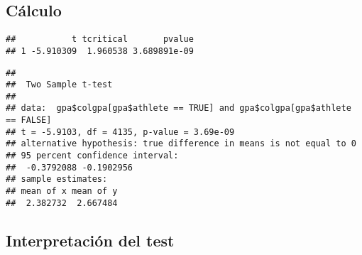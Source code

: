 \documentclass[
]{article}
\newenvironment{Shaded}{\begin{snugshade}}{\end{snugshade}}
\newcommand{\AttributeTok}[1]{\textcolor[rgb]{0.80,0.80,0.80}{#1}}
\newcommand{\CommentTok}[1]{\textcolor[rgb]{0.50,0.62,0.50}{#1}}
\newcommand{\ConstantTok}[1]{\textcolor[rgb]{0.86,0.64,0.64}{\textbf{#1}}}
\newcommand{\FunctionTok}[1]{\textcolor[rgb]{0.94,0.94,0.56}{#1}}
\newcommand{\NormalTok}[1]{\textcolor[rgb]{0.80,0.80,0.80}{#1}}
\newcommand{\SpecialCharTok}[1]{\textcolor[rgb]{0.86,0.64,0.64}{#1}}
\newcommand{\StringTok}[1]{\textcolor[rgb]{0.80,0.58,0.58}{#1}}
\begin{document}
\hypertarget{cuxe1lculo}{%
\subsection{Cálculo}\label{cuxe1lculo}}

\begin{Shaded}
\end{Shaded}

\begin{verbatim}
##           t tcritical       pvalue
## 1 -5.910309  1.960538 3.689891e-09
\end{verbatim}

\begin{Shaded}
\end{Shaded}

\begin{verbatim}
## 
##  Two Sample t-test
## 
## data:  gpa$colgpa[gpa$athlete == TRUE] and gpa$colgpa[gpa$athlete == FALSE]
## t = -5.9103, df = 4135, p-value = 3.69e-09
## alternative hypothesis: true difference in means is not equal to 0
## 95 percent confidence interval:
##  -0.3792088 -0.1902956
## sample estimates:
## mean of x mean of y 
##  2.382732  2.667484
\end{verbatim}

\hypertarget{interpretaciuxf3n-del-test}{%
\subsection{Interpretación del test}\label{interpretaciuxf3n-del-test}}
\end{document}
